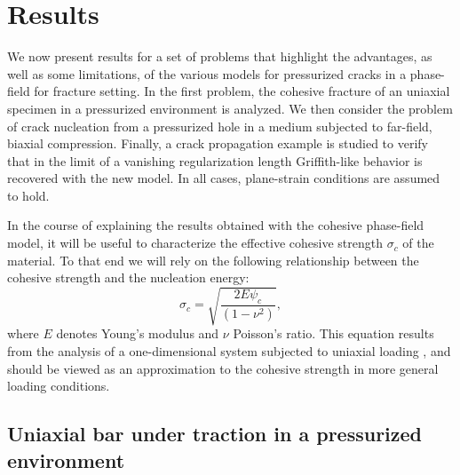 \section{Results}
\label{sec:results}

We now present results for a set of problems that highlight the advantages, as well as some limitations, of the various models for pressurized cracks in a phase-field for fracture setting. In the first problem, the cohesive fracture of an uniaxial specimen in a pressurized environment is analyzed. We then consider the problem of crack nucleation from a pressurized hole in a medium subjected to far-field, biaxial compression.  
Finally, a crack propagation example is studied to verify that in the limit of a vanishing regularization length Griffith-like behavior is recovered with the new model.  In all cases, plane-strain conditions are assumed to hold.  

In the course of explaining the results obtained with the cohesive phase-field model, it will be useful to characterize the effective cohesive strength $\sigma_c$ of the material.  To that end we will rely on the following relationship between the cohesive strength and the nucleation energy:
\begin{equation}
  \label{eq:sigmacrit-from-psicrit}
   \sigma_c = \sqrt{ \dfrac{2E \psi_c }{(1-\nu^2)} },
\end{equation}
where $E$ denotes Young's modulus and $\nu$ Poisson's ratio.  This equation results from the analysis of a one-dimensional system subjected to uniaxial loading \cite{geelen2019phase}, and should be viewed as an approximation to the cohesive strength in more general loading conditions.  


\subsection{Uniaxial bar under traction in a pressurized environment}

